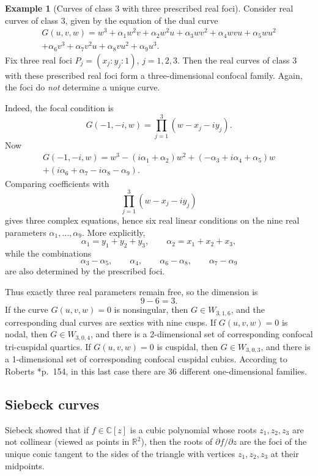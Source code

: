 \documentclass[11pt]{amsart}
\theoremstyle{definition}
\newtheorem{example}[lemma]{Example}
\theoremstyle{remark}
\begin{document}
\begin{example}[Curves of class $3$ with three prescribed real foci]
Consider real curves of class $3$, given by the equation of the dual curve
\begin{multline*}
G(u,v,w)=w^3+\alpha_1w^2v+\alpha_2w^2u+\alpha_3wv^2+\alpha_4wvu+\alpha_5wu^2\\
+\alpha_6v^3+\alpha_7v^2u+\alpha_8vu^2+\alpha_9u^3.
\end{multline*}
Fix three real foci $P_j=(x_j:y_j:1)$, $j=1,2,3$. Then the real curves of class $3$ with these
prescribed real foci form a three-dimensional confocal family. Again, the foci do
\emph{not} determine a unique curve.

Indeed, the focal condition is
\[
G(-1,-i,w)=\prod_{j=1}^3(w-x_j-iy_j).
\]
Now
\begin{multline*}
G(-1,-i,w)=w^3-(i\alpha_1+\alpha_2)w^2+(-\alpha_3+i\alpha_4+\alpha_5)w\\
+(i\alpha_6+\alpha_7-i\alpha_8-\alpha_9).
\end{multline*}
Comparing coefficients with
\[
\prod_{j=1}^3(w-x_j-iy_j)
\]
gives three complex equations, hence six real linear conditions on the nine real
parameters $\alpha_1,\dots,\alpha_9$. More explicitly,
\[
\alpha_1=y_1+y_2+y_3,\qquad
\alpha_2=x_1+x_2+x_3,
\]
while the combinations
\[
\alpha_3-\alpha_5,\qquad \alpha_4,\qquad \alpha_6-\alpha_8,\qquad \alpha_7-\alpha_9
\]
are also determined by the prescribed foci.

Thus exactly three real parameters remain free, so the dimension is
\[
9-6=3.
\]
If the curve $G(u,v,w)=0$ is nonsingular, then $G\in W_{3,1,6}$, and the corresponding dual curves are sextics with nine cusps. If $G(u,v,w)=0$ is nodal, then $G\in W_{3,0,4}$, and there is a 2-dimensional set of corresponding confocal tri-cuspidal quartics. If $G(u,v,w)=0$ is cuspidal, then $G\in W_{3,0,3}$, and there is a 1-dimensional set of corresponding confocal cuspidal cubics. According to Roberts \cite{Roberts1901}*{p.~154}, in this last case there are 36 different one-dimensional families.
\end{example}

\subsection{Siebeck curves}
Siebeck \cite{Siebeck} showed that if $f\in \mathbb C[z]$ is a cubic polynomial whose
roots $z_1,z_2,z_3$ are not collinear (viewed as points in $\mathbb R^2$), then the roots
of $\partial f/\partial z$ are the foci of the unique conic tangent to the sides of the
triangle with vertices $z_1,z_2,z_3$ at their midpoints.
\end{document}
